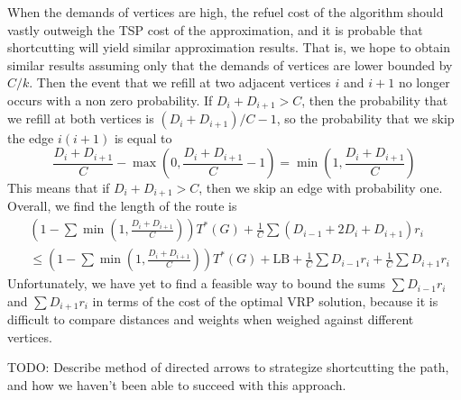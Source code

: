 \documentclass{article}
\theoremstyle{plain}
\begin{document}
When the demands of vertices are high, the refuel cost of the algorithm should vastly outweigh the TSP cost of the approximation, and it is probable that shortcutting will yield similar approximation results. That is, we hope to obtain similar results assuming only that the demands of vertices are lower bounded by $C/k$. Then the event that we refill at two adjacent vertices $i$ and $i+1$ no longer occurs with a non zero probability. If $D_i + D_{i+1} > C$, then the probability that we refill at both vertices is $(D_i + D_{i+1})/C - 1$, so the probability that we skip the edge $i(i+1)$ is equal to
%
\[ \frac{D_i + D_{i+1}}{C} - \max \left(0, \frac{D_i + D_{i+1}}{C} - 1 \right) = \min \left( 1, \frac{D_i + D_{i+1}}{C} \right) \]
%
This means that if $D_i + D_{i+1} > C$, then we skip an edge with probability one. Overall, we find the length of the route is
%
\begin{align*}
    &\left( 1 - \sum \min \left( 1, \frac{D_i + D_{i+1}}{C} \right) \right) T^*(G) + \frac{1}{C} \sum \left( D_{i-1} + 2D_i + D_{i+1} \right) r_i\\
    &\leq \left( 1 - \sum \min \left( 1, \frac{D_i + D_{i+1}}{C} \right) \right) T^*(G) + \text{LB} + \frac{1}{C} \sum D_{i-1} r_i + \frac{1}{C} \sum D_{i+1} r_i
\end{align*}
%
Unfortunately, we have yet to find a feasible way to bound the sums $\sum D_{i-1} r_i$ and $\sum D_{i+1} r_i$ in terms of the cost of the optimal VRP solution, because it is difficult to compare distances and weights when weighed against different vertices.

TODO: Describe method of directed arrows to strategize shortcutting the path, and how we haven't been able to succeed with this approach.







%
%
\end{document}
